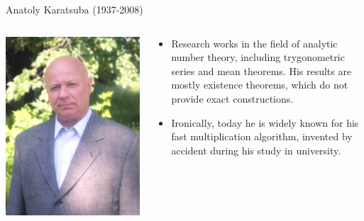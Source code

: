 \documentclass[handout]{beamer}
\begin{document}
\begin{frame}{Anatoly Karatsuba (1937-2008)}

  \begin{columns}[T]
    \begin{column}{.5\textwidth}
      \includegraphics[width=\textwidth]{karatsuba.jpg}
    \end{column}
    \begin{column}{.5\textwidth}
        \begin{itemize}
        \item
        Research works in the field of analytic number theory,
          including trygonometric series and mean theorems.
          His results are mostly existence theorems, which do not
          provide exact constructions.

        \bigskip

        \item
        Ironically, today he is widely known
          for his fast multiplication algorithm,
          invented by accident during his study in university.
        \end{itemize}
    \end{column}
  \end{columns}

\end{frame}
\end{document}
